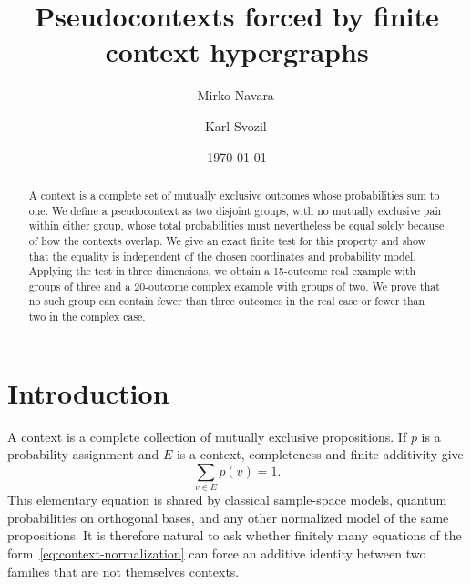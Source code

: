 \documentclass[
  twocolumn,
  aps,
  pra,
  floatfix,
  amsmath,amssymb,
  longbibliography
]{revtex4-2}
\theoremstyle{definition}
\theoremstyle{remark}
\begin{document}
\title{Pseudocontexts forced by finite context hypergraphs}

\author{Mirko Navara\,}

\author{Karl Svozil\,}

\date{\today}

\begin{abstract}
A context is a complete set of mutually exclusive outcomes whose probabilities sum to one. We define a pseudocontext as two disjoint groups, with no mutually exclusive pair within either group, whose total probabilities must nevertheless be equal solely because of how the contexts overlap. We give an exact finite test for this property and show that the equality is independent of the chosen coordinates and probability model. Applying the test in three dimensions, we obtain a 15-outcome real example with groups of three and a 20-outcome complex example with groups of two. We prove that no such group can contain fewer than three outcomes in the real case or fewer than two in the complex case.
\end{abstract}

\maketitle

\section{Introduction}

A context is a complete collection of mutually exclusive propositions.  If
$p$ is a probability assignment and $E$ is a context, completeness and finite
additivity give
\begin{equation}
  \sum_{v\in E}p(v)=1.
  \label{eq:context-normalization}
\end{equation}
This elementary equation is shared by classical sample-space models,
quantum probabilities on orthogonal bases, and any other normalized model of
the same propositions.  It is therefore natural to ask whether finitely many
equations of the form~\eqref{eq:context-normalization} can force an additive
identity between two families that are not themselves contexts.
\end{document}
